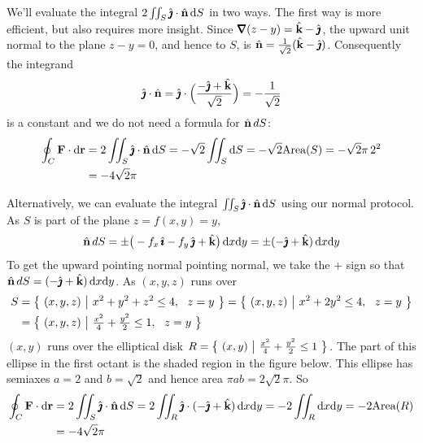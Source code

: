 \begin{eg}
We'll evaluate the integral $2\iint_S \hat{\pmb{\jmath}}\cdot\hat{\mathbf{n}}\,\mathrm{d}S$ in two ways.
The first way is more efficient, but also requires more insight.
Since $\vnabla(z-y)=\hk-\hj$, the upward unit normal to the plane $z-y=0$, 
and hence to $S$, is $\hat{\mathbf{n}} = \frac{1}{\sqrt{2}}(\hat{\mathbf{k}}-\hat{\pmb{\jmath}})$.
Consequently the integrand 
\begin{align*}
\hat{\pmb{\jmath}}\cdot\hat{\mathbf{n}}=\hat{\pmb{\jmath}}\cdot\Big(\frac{-\hat{\pmb{\jmath}}+\hat{\mathbf{k}}}{\sqrt{2}}\Big)=-\frac{1}{\sqrt{2}}
\end{align*}
is a constant and we do not need a formula for $\hat{\mathbf{n}}\,dS$:
\begin{align*}
\oint_C\mathbf{F}\cdot\mathrm{d}\mathbf{r}
& = 2\iint_S \hat{\pmb{\jmath}}\cdot\hat{\mathbf{n}}\,\mathrm{d}S
=-\sqrt{2} \iint_S \mathrm{d}S 
= -\sqrt{2}\text{Area}(S)
=-\sqrt{2}\pi\, 2^2 \\
&=-4\sqrt{2}\pi
\end{align*}

Alternatively, we can evaluate the integral $\iint_S \hat{\pmb{\jmath}}\cdot\hat{\mathbf{n}}\,\mathrm{d}S$
using our normal protocol. 
As $S$ is part of the plane $z=f(x,y)=y$,
\begin{align*}
\hat{\mathbf{n}}\,dS = \pm\big(-f_x\,\hat{\pmb{\imath}}-f_y\,\hat{\pmb{\jmath}}+\hat{\mathbf{k}}\big)\,\mathrm{d}x\mathrm{d}y
        = \pm (-\hat{\pmb{\jmath}}+\hat{\mathbf{k}})\,\mathrm{d}x\mathrm{d}y
\end{align*}
To get the upward pointing normal pointing normal, we take the $+$ sign
so that $\hat{\mathbf{n}}\,dS= (-\hat{\pmb{\jmath}}+\hat{\mathbf{k}})\,\mathrm{d}x\mathrm{d}y$. As $(x,y,z)$ runs over
\begin{align*}
S &= \big\{ \ (x,y,z)\ \big|\  x^2+y^2+z^2\le 4,\ \ z=y\ \big\}
  = \big\{ \ (x,y,z)\ \big|\  x^2+2y^2\le 4,\ \ z=y\ \big\} \\
  &= \big\{ \ (x,y,z)\ \big|\  \tfrac{x^2}{4} +\tfrac{y^2}{2}\le 1,\ \ z=y\ \big\} 
\end{align*}
$(x,y)$ runs over the elliptical disk 
$R=\big\{ \ (x,y)\ \big|\ \frac{x^2}{4} +\frac{y^2}{2}\le 1\ \big\}$. 
The part of this ellipse in the first octant is the shaded region in 
the figure below.
This ellipse has semiaxes $a=2$ and $b =\sqrt{2}$ and hence area $\pi a b = 2\sqrt{2} \pi$. So
\begin{align*}
\oint_C\mathbf{F}\cdot\mathrm{d}\mathbf{r}
& = 2\iint_S \hat{\pmb{\jmath}}\cdot\hat{\mathbf{n}}\,\mathrm{d}S
=2\iint_R \hat{\pmb{\jmath}}\cdot(-\hat{\pmb{\jmath}}+\hat{\mathbf{k}})\,\mathrm{d}x\mathrm{d}y
=-2 \iint_R \mathrm{d}x\mathrm{d}y 
= -2\text{Area}(R)\\
&=-4\sqrt{2}\pi
\end{align*}
\end{eg}

